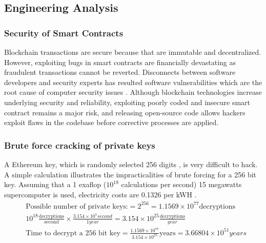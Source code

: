 \subsection{Engineering Analysis}
 \subsubsection{Security of Smart Contracts}
 
 Blockchain transactions are secure because that are immutable and decentralized. However, exploiting bugs in smart contracts are financially devastating \cite{funnyJoke:Online} as fraudulent transactions cannot be reverted. Disconnects between software developers and security experts has resulted software vulnerabilities which are the root cause of computer security issues \cite{Liu:2012:SVD:2475183.2476546}. Although \gls{blockchain} technologies increase underlying security and reliability, exploiting poorly coded and insecure \gls{smart contract} remains a major risk, and releasing open-source code allows hackers exploit flaws in the codebase before corrective processes are applied.  



\subsubsection{Brute force cracking of private keys}
A \gls{Ethereum} key, which is randomly selected 256 digits \cite{ethereumWhitePaper:Online}, is very difficult to hack. A simple calculation illustrates the impracticalities of brute forcing for a 256 bit key. Assuming that a 1 exaflop ($10^{18}$ calculations per second) 15 megawatts supercomputer \cite{Service617} is used, electricity costs are 0.1326 per kWH \cite{BCHydroRates}. %
\vspace*{-0.1cm}
\begin{align}
& \text{Possible number of private keys:} = 2^{256} = 1.1569 \times 10^{77} \text{decryptions} \\
& 10^{18} \frac{\text{decryptions}}{\text{second}} \times \frac{3.154 \times 10^7 second}{1 year} = 3.154 \times 10^{25} \frac{\text{decryptions}}{year} \\
& \text{Time to decrypt a 256 bit key} = \frac{1.1569 \times 10^{77} }{3.154 \times 10^{25} } \text{years}= 3.66804 \times 10^{51} years
\end{align}

